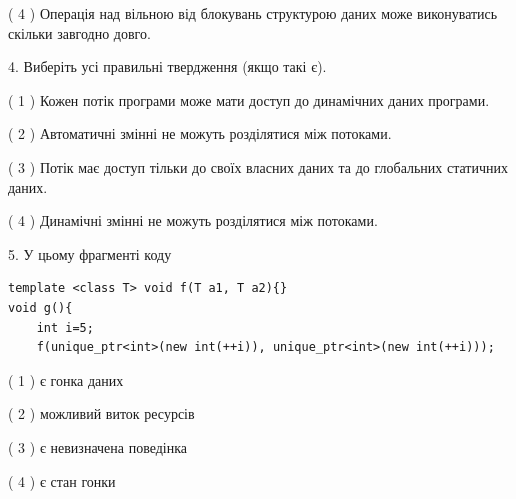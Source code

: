 \documentclass[12pt, ukrainian]{article}
\begin{document}
\begin {large}
{( 4 ) Операція над вільною від блокувань структурою даних може виконуватись скільки завгодно довго.%


4. Виберіть усі правильні твердження (якщо такі є).\par
\vspace{2mm}

( 1 ) Кожен потік програми може мати доступ до динамічних даних програми.%

( 2 ) Автоматичні змінні не можуть розділятися між потоками.%

( 3 ) Потік має доступ тільки до своїх власних даних та до глобальних статичних даних.%

( 4 ) Динамічні змінні не можуть розділятися між потоками.%


5. У цьому фрагменті коду
\begin{verbatim}
template <class T> void f(T a1, T a2){}
void g(){
    int i=5;
    f(unique_ptr<int>(new int(++i)), unique_ptr<int>(new int(++i)));
\end{verbatim}

( 1 ) є гонка даних%

( 2 ) можливий виток ресурсів%

( 3 ) є невизначена поведінка%

( 4 ) є стан гонки%
}
\end {large}
\end{document}
